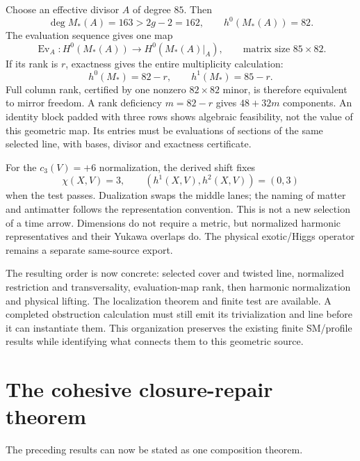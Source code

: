 \documentclass[11pt,a4paper]{article}
\begin{document}
Choose an effective divisor \(A\) of degree \(85\). Then
\[
 \deg M_\ast(A)=163>2g-2=162,\qquad h^0(M_\ast(A))=82.
\]
The evaluation sequence gives one map
\[
 \operatorname{Ev}_A:H^0(M_\ast(A))\longrightarrow
 H^0(M_\ast(A)|_A),\qquad \text{matrix size }85\times82.
\]
If its rank is \(r\), exactness gives the entire multiplicity calculation:
\[
 h^0(M_\ast)=82-r,\qquad h^1(M_\ast)=85-r.
\]
Full column rank, certified by one nonzero \(82\times82\) minor,
is therefore equivalent to mirror freedom. A rank deficiency
\(m=82-r\) gives \(48+32m\) components. An identity block padded
with three rows shows algebraic feasibility, not the value of this
geometric map. Its entries must be evaluations of sections of the
same selected line, with bases, divisor and exactness certificate.

For the \(c_3(V)=+6\) normalization, the derived shift fixes
\[
 \chi(X,V)=3,\qquad (h^1(X,V),h^2(X,V))=(0,3)
\]
when the test passes. Dualization swaps the middle lanes; the naming
of matter and antimatter follows the representation convention.
This is not a new selection of a time arrow. Dimensions do not
require a metric, but normalized harmonic representatives and their
Yukawa overlaps do. The physical exotic/Higgs operator remains a
separate same-source export.

The resulting order is now concrete: selected cover and twisted line,
normalized restriction and transversality, evaluation-map rank, then
harmonic normalization and physical lifting. The localization theorem
and finite test are available. A completed obstruction calculation
must still emit its trivialization and line before it can instantiate
them. This organization preserves the existing finite SM/profile
results while identifying what connects them to this geometric source.

\section{The cohesive closure-repair theorem}
\label{sec:master}

The preceding results can now be stated as one composition theorem.
\end{document}
